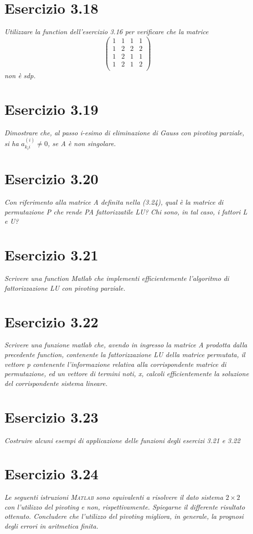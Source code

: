 \section{Esercizio 3.18}
\emph{Utilizzare la function dell'esercizio 3.16 per verificare che la matrice}\\
   $$\begin{pmatrix}
      1 & 1 & 1 & 1 \\
      1 & 2 & 2 & 2 \\
      1 & 2 & 1 & 1 \\
      1 & 2 & 1 & 2 \\
   \end{pmatrix}$$
\emph{non è sdp.}
\section{Esercizio 3.19}
\emph{Dimostrare che, al passo i-esimo di eliminazione di Gauss con pivoting parziale, si ha $a_{k_{i}i}^{(i)} \neq 0 $, se A è non singolare.}
\section{Esercizio 3.20}
\emph{Con riferimento alla matrice A definita nella (3.24), qual è la matrice di permutazione P che rende PA fattorizzatile LU? Chi sono, in tal caso, i fattori L e U?}
\section{Esercizio 3.21}
\emph{Scrivere una function Matlab che implementi efficientemente l'algoritmo di fattorizzazione LU con pivoting parziale.}
\section{Esercizio 3.22}
\emph{Scrivere una funzione matlab che, avendo in ingresso la matrice A prodotta dalla precedente function, contenente la fattorizzazione LU della matrice permutata, il vettore p contenente l'informazione relativa alla corrispondente matrice di permutazione, ed un vettore di termini noti, x, calcoli efficientemente la soluzione del corrispondente sistema lineare.}
\section{Esercizio 3.23}
\emph{Costruire alcuni esempi di applicazione delle funzioni degli esercizi 3.21 e 3.22}
\section{Esercizio 3.24}
\emph{Le seguenti istruzioni \textsc{Matlab} sono equivalenti a risolvere il dato sistema $2\times 2$ con l'utilizzo del pivoting e non, rispettivamente. Spiegarne il differente risultato ottenuto. Concludere che l'utilizzo del pivoting migliora, in generale, la prognosi degli errori in aritmetica finita.}

